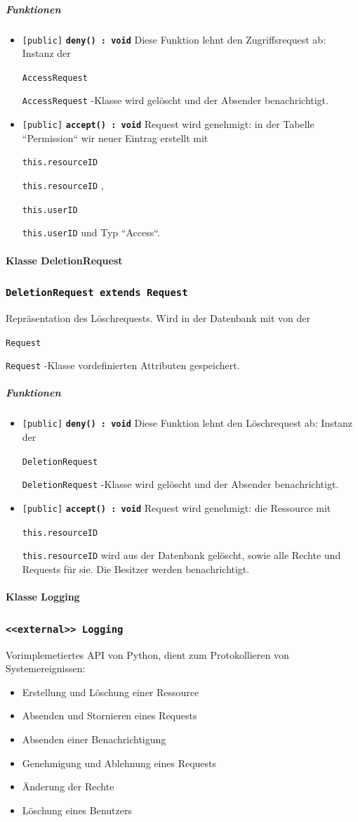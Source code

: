 \documentclass[parskip=full,11pt]{scrartcl}
\makeatletter
\newcommand{\lstInline}[2][,]{%
	\begingroup%
	\lstset{#1}%
	\begin{lrbox}{\mylisting}\lstinline!#2!\end{lrbox}%
	\setlength{\@tempdima}{\linegoal}%
	\ifdim\wd\mylisting>\@tempdima\hfill\\\fi%
	\lstinline!#2!%
	\endgroup%
}
\newcommand{\class}[1]{\subsubsection*{\lstinline[basicstyle=\ttfamily\large]{#1}}}
\newcommand{\mtd}[5]{\lstinline{[#4]} \textbf{\lstinline{#1(#3) : #2}} \newline #5}
\newcommand{\inlinecode}[1]{\lstInline[breaklines=true]{#1}}
\makeatother
\begin{document}
\subparagraph*{Funktionen}  %
\begin{itemize}
	\item \mtd{deny}{void}{}{public}{
	Diese Funktion lehnt den Zugriffsrequest ab: Instanz der \inlinecode{AccessRequest}-Klasse wird gelöscht und der Absender benachrichtigt.
	}
	
	\item \mtd{accept}{void}{}{public}{
	Request wird genehmigt: in der Tabelle ``Permission`` wir neuer Eintrag erstellt mit \inlinecode{this.resourceID}, \inlinecode{this.userID} und Typ ``Access``.
	}
\end{itemize}

  \paragraph*{Klasse DeletionRequest}
  
 \class{DeletionRequest extends Request}
Repräsentation des Löschrequests. Wird in der Datenbank mit von der \inlinecode{Request}-Klasse vordefinierten Attributen gespeichert.
 
\subparagraph*{Funktionen}  %
\begin{itemize}
	\item \mtd{deny}{void}{}{public}{
	Diese Funktion lehnt den Löschrequest ab: Instanz der \inlinecode{DeletionRequest}-Klasse wird gelöscht und der Absender benachrichtigt.
	}
	
	\item \mtd{accept}{void}{}{public}{
	Request wird genehmigt: die Ressource mit \inlinecode{this.resourceID} wird aus der Datenbank gelöscht, sowie alle Rechte und Requests für sie. Die Besitzer werden benachrichtigt.
	}
\end{itemize}
\newpage
  \paragraph*{Klasse Logging}
 \class{<<external>> Logging}
Vorimplemetiertes API von Python, dient zum Protokollieren von Systemereignissen:
\begin{itemize}
	\item Erstellung und Löschung einer Ressource
	\item Absenden und Stornieren eines Requests
	\item Absenden einer Benachrichtigung
	\item Genehmigung und Ablehnung eines Requests
	\item Änderung der Rechte
	\item Löschung eines Benutzers 
\end{itemize}
 
\end{document}
